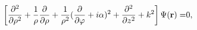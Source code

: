 \begin{equation}
\left[ \frac{\partial ^{2}}{\partial \rho ^{2}}+\frac{1}{\rho }\frac{%
\partial }{\partial \rho }+\frac{1}{\rho ^{2}}(\frac{\partial }{\partial
\varphi }+i\alpha )^{2}+\frac{\partial ^{2}}{\partial z^{2}}+k^{2}\right]
\Psi (\mathbf{r)=}0,
\label{eq2}
\end{equation}

